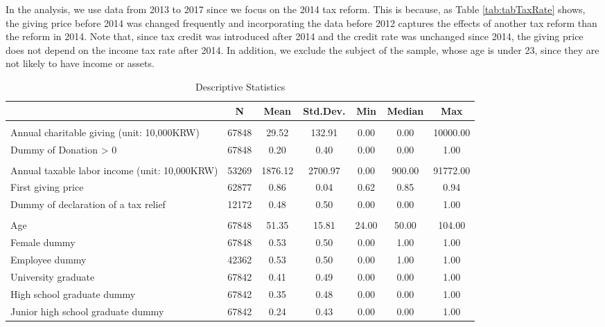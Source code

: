 \documentclass[
  11pt,
  a4paper,
]{article}
\begin{document}
In the analysis, we use data from 2013 to 2017 since we focus on the 2014 tax reform. This is because, as Table \ref{tab:tabTaxRate} shows, the giving price before 2014 was changed frequently and incorporating the data before 2012 captures the effects of another tax reform than the reform in 2014. Note that, since tax credit was introduced after 2014 and the credit rate was unchanged since 2014, the giving price does not depend on the income tax rate after 2014.
In addition, we exclude the subject of the sample, whose age is under 23, since they are not likely to have income or assets.

\begin{table}

\caption{\label{tab:SummaryCovariate}Descriptive Statistics}
\centering
\fontsize{7}{9}\selectfont
\begin{tabular}[t]{lcccccc}
\toprule
 & N & Mean & Std.Dev. & Min & Median & Max\\
\midrule
\addlinespace[0.3em]
\multicolumn{7}{l}{\textbf{Charitable Donations}}\\
\hspace{1em}Annual charitable giving (unit: 10,000KRW) & 67848 & 29.52 & 132.91 & 0.00 & 0.00 & 10000.00\\
\hspace{1em}Dummy of Donation > 0 & 67848 & 0.20 & 0.40 & 0.00 & 0.00 & 1.00\\
\addlinespace[0.3em]
\multicolumn{7}{l}{\textbf{Income, giving price, and tax report}}\\
\hspace{1em}Annual taxable labor income (unit: 10,000KRW) & 53269 & 1876.12 & 2700.97 & 0.00 & 900.00 & 91772.00\\
\hspace{1em}First giving price & 62877 & 0.86 & 0.04 & 0.62 & 0.85 & 0.94\\
\hspace{1em}Dummy of declaration of a tax relief & 12172 & 0.48 & 0.50 & 0.00 & 0.00 & 1.00\\
\addlinespace[0.3em]
\multicolumn{7}{l}{\textbf{Individual Characteristics}}\\
\hspace{1em}Age & 67848 & 51.35 & 15.81 & 24.00 & 50.00 & 104.00\\
\hspace{1em}Female dummy & 67848 & 0.53 & 0.50 & 0.00 & 1.00 & 1.00\\
\hspace{1em}Employee dummy & 42362 & 0.53 & 0.50 & 0.00 & 1.00 & 1.00\\
\hspace{1em}University graduate & 67842 & 0.41 & 0.49 & 0.00 & 0.00 & 1.00\\
\hspace{1em}High school graduate dummy & 67842 & 0.35 & 0.48 & 0.00 & 0.00 & 1.00\\
\hspace{1em}Junior high school graduate dummy & 67842 & 0.24 & 0.43 & 0.00 & 0.00 & 1.00\\
\bottomrule
\end{tabular}
\end{table}
\end{document}
